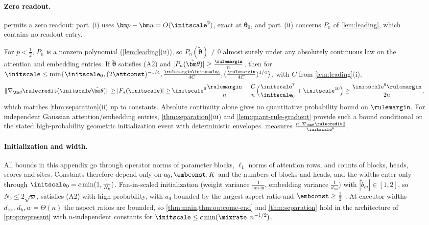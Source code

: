 \paragraph{Zero readout.}\label{rem:zero-readout}  permits a zero readout: part~(i) uses $\bm p-\bm u=O(\initscale^2)$, exact at $\bm\theta_0$, and part~(ii) concerns $P_n$ of
\cref{lem:leading}, which contains no readout entry.


\begin{remark}
\label{rem:generic-rule}
For $p<\frac{1}{2}$, $P_n$ is a nonzero polynomial (\cref{lem:leading}(ii)), so $P_n(\tilde{\bm\theta})\ne0$ almost surely under any absolutely continuous law on
the attention and embedding entries. If $\tilde{\bm\theta}$ satisfies (A2) and $|P_n(\tilde{\bm\theta})|\ge\frac{\rulemargin}{n}$, then for
$\initscale\le\min\{\initscale_0,(2\attconst)^{-1/4},\frac{\rulemargin\initscale_0}{4C},(\frac{\rulemargin}{4C})^{1/4}\}$, with $C$ from \cref{lem:leading}(i),
\[
 \|\nabla_{\bm\theta}\rulecredit(\initscale\tilde{\bm\theta})\|\ge|F_n(\initscale)|\ge\initscale^6\frac{\rulemargin}{n}-\frac{C}{n}\Bigl(\frac{\initscale^7}{\initscale_0}+\initscale^{10}\Bigr)\ge\frac{\initscale^6\rulemargin}{2n},
\]
which matches \cref{thm:separation}(ii) up to constants. Absolute continuity alone
gives no quantitative probability bound on $\rulemargin$. For independent Gaussian
attention/embedding entries, \cref{thm:separation}(iii) and
\cref{lem:quant-rule-gradient} provide such a bound conditional on the stated
high-probability geometric initialization event with deterministic envelopes.  measures $\frac{n\|\nabla_{\bm\theta}\rulecredit\|}{\initscale^6}$.
\end{remark}

\paragraph{Initialization and width.}
\label{rem:end-width}
All bounds in this appendix go through operator norms of parameter blocks, $\ell_1$ norms of attention rows, and counts of blocks,
heads, scores and sites. Constants therefore depend only on $a_0,\embconst,K$ and the numbers of blocks and heads, and the widths enter only
through $\initscale_0=c\min(1,\frac{1}{N_b})$. Fan-in-scaled initialization (weight variance $\frac{1}{\text{fan-in}}$, embedding variance $\frac{1}{d_{\mathrm{res}}}$) with
$|\tilde b_m|\in[1,2]$, so $N_b\le2\sqrt w$, satisfies (A2) with high probability, with $a_0$ bounded by the largest aspect ratio and $\embconst\ge\frac{1}{2}$
\citep[Thms.~4.4.5, 4.6.1]{vershynin2018high}. At executor widths $d_{\mathrm{res}},d_{\mathrm h},w=\Theta(n)$ the aspect ratios are bounded, so
\cref{thm:main,thm:outcome-end} and \cref{thm:separation} hold in the architecture of \cref{prop:represent} with $n$-independent constants for
$\initscale\le c\min(\mixrate,n^{-1/2})$.


